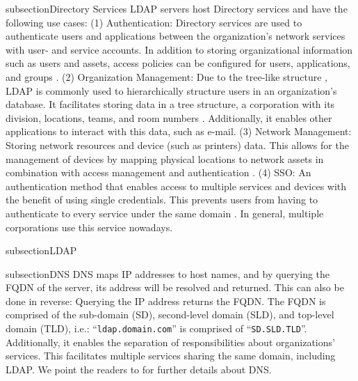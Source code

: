 subsection{Directory Services}
\gls{LDAP} servers host Directory services and have the following use cases:
(1) Authentication: Directory services are used to authenticate users and applications between the organization's network services with user- and service accounts. In addition to storing organizational information such as users and assets, access policies can be configured for users, applications, and groups \cite{desmond_active_2008}.
(2) Organization Management: Due to the tree-like structure \cite{x500}, \gls{LDAP} is commonly used to hierarchically structure users in an organization's database. It facilitates storing data in a tree structure, \ie a corporation with its division, locations, teams, and room numbers \cite{IYER2020112}. Additionally, it enables other applications to interact with this data, such as e-mail.
(3) Network Management: Storing network resources and device (such as printers) data. This allows for the management of devices by mapping physical locations to network assets in combination with access management and authentication \cite{IYER2020112}.
(4) \gls{SSO}: An authentication method that enables access to multiple services and devices with the benefit of using single credentials. This prevents users from having to authenticate to every service under the same domain \cite{subbarao_microsoft_2023}. In general, multiple corporations use this service nowadays.

subsection{LDAP}  %

subsection{DNS}
\gls{DNS} maps \gls{IP} addresses to host names, and by querying the \gls{FQDN} of the server, its address will be resolved and returned. This can also be done in reverse: Querying the \gls{IP} address returns the \gls{FQDN}. The \gls{FQDN} is comprised of the sub-domain (SD), second-level domain (SLD), and top-level domain (TLD), i.e.: ``\verb|ldap.domain.com|'' is comprised of ``\verb|SD.SLD.TLD|''. Additionally, it enables the separation of responsibilities about organizations' services. This facilitates multiple services sharing the same domain, including \gls{LDAP}. We point the readers to \cite{VANDERTOORN2022100469} for further details about \gls{DNS}.
\fi

